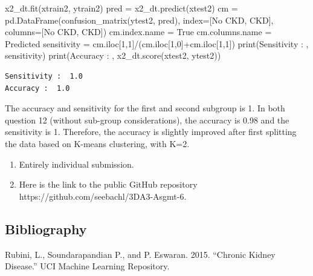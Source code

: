 \documentclass[
  11pt,
  letterpaper,
  DIV=11,
  numbers=noendperiod]{scrartcl}
\newenvironment{Shaded}{\begin{snugshade}}{\end{snugshade}}
\newcommand{\BuiltInTok}[1]{\textcolor[rgb]{0.00,0.23,0.31}{#1}}
\newcommand{\DecValTok}[1]{\textcolor[rgb]{0.68,0.00,0.00}{#1}}
\newcommand{\NormalTok}[1]{\textcolor[rgb]{0.00,0.23,0.31}{#1}}
\newcommand{\OperatorTok}[1]{\textcolor[rgb]{0.37,0.37,0.37}{#1}}
\newcommand{\StringTok}[1]{\textcolor[rgb]{0.13,0.47,0.30}{#1}}
\newlength{\cslhangindent}
\newenvironment{CSLReferences}[2] %
 {\begin{list}{}{%
  \setlength{\itemindent}{0pt}
  \setlength{\leftmargin}{0pt}
  \setlength{\parsep}{0pt}
  \ifodd #1
   \setlength{\leftmargin}{\cslhangindent}
   \setlength{\itemindent}{-1\cslhangindent}
  \fi
  \setlength{\itemsep}{#2\baselineskip}}}
 {\end{list}}
\begin{document}
\begin{Shaded}
\begin{Highlighting}[]
\NormalTok{x2\_dt.fit(xtrain2, ytrain2)}
\NormalTok{pred }\OperatorTok{=}\NormalTok{ x2\_dt.predict(xtest2)}
\NormalTok{cm }\OperatorTok{=}\NormalTok{ pd.DataFrame(confusion\_matrix(ytest2, pred), index}\OperatorTok{=}\NormalTok{[}\StringTok{\textquotesingle{}No CKD\textquotesingle{}}\NormalTok{, }\StringTok{\textquotesingle{}CKD\textquotesingle{}}\NormalTok{], columns}\OperatorTok{=}\NormalTok{[}\StringTok{\textquotesingle{}No CKD\textquotesingle{}}\NormalTok{, }\StringTok{\textquotesingle{}CKD\textquotesingle{}}\NormalTok{])}
\NormalTok{cm.index.name }\OperatorTok{=} \StringTok{\textquotesingle{}True\textquotesingle{}}
\NormalTok{cm.columns.name }\OperatorTok{=} \StringTok{\textquotesingle{}Predicted\textquotesingle{}}
\NormalTok{sensitivity }\OperatorTok{=}\NormalTok{ cm.iloc[}\DecValTok{1}\NormalTok{,}\DecValTok{1}\NormalTok{]}\OperatorTok{/}\NormalTok{(cm.iloc[}\DecValTok{1}\NormalTok{,}\DecValTok{0}\NormalTok{]}\OperatorTok{+}\NormalTok{cm.iloc[}\DecValTok{1}\NormalTok{,}\DecValTok{1}\NormalTok{])}
\BuiltInTok{print}\NormalTok{(}\StringTok{\textquotesingle{}Sensitivity : \textquotesingle{}}\NormalTok{, sensitivity)}
\BuiltInTok{print}\NormalTok{(}\StringTok{\textquotesingle{}Accuracy : \textquotesingle{}}\NormalTok{, x2\_dt.score(xtest2, ytest2))}
\end{Highlighting}
\end{Shaded}

\begin{verbatim}
Sensitivity :  1.0
Accuracy :  1.0
\end{verbatim}

The accuracy and sensitivity for the first and second subgroup is 1. In
both question 12 (without sub-group considerations), the accuracy is
0.98 and the sensitivity is 1. Therefore, the accuracy is slightly
improved after first splitting the data based on K-means clustering,
with K=2.

\begin{enumerate}
\def\labelenumi{\arabic{enumi}.}
\setcounter{enumi}{14}
\item
  Entirely individual submission.
\item
  Here is the link to the public GitHub repository
  https://github.com/seebachl/3DA3-Asgmt-6.
\end{enumerate}

\subsection*{Bibliography}\label{bibliography}

\label{refs}
\begin{CSLReferences}{1}{0}
Rubini, L., Soundarapandian P., and P. Eswaran. 2015. {``{Chronic Kidney
Disease}.''} UCI Machine Learning Repository.

\end{CSLReferences}
\end{document}
